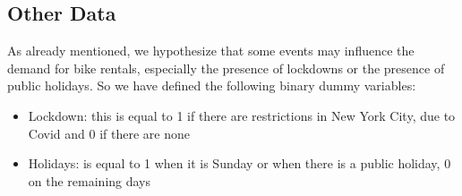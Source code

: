\subsection{Other Data}
As already mentioned, we hypothesize that some events may influence the demand for bike rentals, especially the presence of lockdowns or the presence of public holidays. So we have defined the following binary dummy variables:
\begin{itemize}
	\item Lockdown: this is equal to 1 if there are restrictions in New York City, due to Covid and 0 if there are none
	\item Holidays: is equal to 1 when it is Sunday or when there is a public holiday, 0 on the remaining days
\end{itemize}